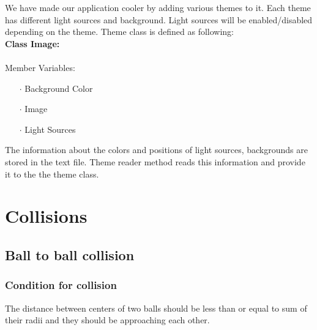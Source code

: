 \documentclass[a4paper,12pt]{report}
\begin{document}
We have made our application cooler by adding various themes to it. Each theme has different light sources and background. Light sources will be enabled/disabled depending on the theme. Theme class is defined as following:\\
\textbf{Class Image:}\\\\
\hspace*{5mm}Member Variables:
\begin{itemize}
\item[$\cdot$] Background Color  
\item[$\cdot$] Image  
\item[$\cdot$] Light Sources  
\end{itemize}
The information about the colors and positions of light sources, backgrounds are stored in the text file. Theme reader method reads this information and provide it to the the theme class.

\chapter{Collisions}
\section{Ball to ball collision}
\subsection*{Condition for collision}
The distance between centers of two balls should be less than or equal to sum of their radii and they should be approaching each other.
\end{document}
